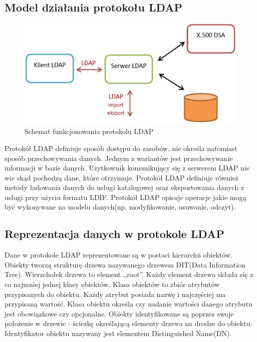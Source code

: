 	\subsection{Model działania protokołu LDAP}

		\begin{figure}[h]
			\centering
			\includegraphics{img/ldap.jpg}
			\caption{Schemat funkcjonowania protokolu  LDAP}
			\label{Schemat funkcjonowania protokolu  LDAP}
		\end{figure}

		Protokół LDAP definiuje sposób dostępu do zasobów, nie określa natomiast sposób przechowywania danych. Jednym z wariantów jest przechowywanie informacji w bazie danych. Użytkownik komunikujący się z serwerem LDAP nie wie skąd pochodzą dane, które otrzymuje. Protokół LDAP definiuje również metody ładowania danych do usługi katalogowej oraz eksportowania danych z usługi przy użyciu formatu LDIF. Protokół LDAP opisuje operacje jakie mogą być wykonywane na modelu danych(np. modyfikowanie, usuwanie, odczyt).

	\subsection{Reprezentacja danych w protokole LDAP}

		Dane w protokole LDAP reprezentowane są w postaci hierarchii obiektów\cite{ZyTrax13}. Obiekty tworzą strukturę drzewa nazywanego drzewem DIT(Data Information Tree). Wierzchołek drzewa to element ,,root''. Każdy element drzewa składa się z co najmniej jednej klasy obiektów. Klasa obiektów to zbiór atrybutów przypisanych do obiektu. Każdy atrybut posiada nazwę i najczęściej ma przypisaną wartość. Klasa obiektu określa czy nadanie wartości danego atrybutu jest obowiązkowe czy opcjonalne. Obiekty identyfikowane są poprzez swoje położenie w drzewie - ścieżkę określającą elementy drzewa na drodze do obiektu. Identyfikator obiektu nazywany jest elementem Distinguished Name(DN).

